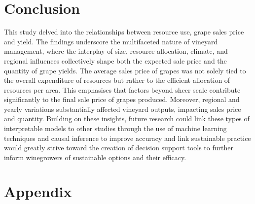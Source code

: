 \documentclass[10pt,letterpaper]{article}
\begin{document}
\section*{Conclusion}

This study delved into the relationships between resource use, grape sales price and yield. The findings underscore the multifaceted nature of vineyard management, where the interplay of size, resource allocation, climate, and regional influences collectively shape both the expected sale price and the quantity of grape yields. The average sales price of grapes was not solely tied to the overall expenditure of resources but rather to the efficient allocation of resources per area. This emphasises that factors beyond sheer scale contribute significantly to the final sale price of grapes produced. Moreover, regional and yearly variations substantially affected vineyard outputs, impacting sales price and quantity. Building on these insights, future research could link these types of interpretable models to other studies through the use of machine learning techniques and causal inference to improve accuracy and link sustainable practice would greatly strive toward the creation of decision support tools to further inform winegrowers of sustainable options and their efficacy.

\nolinenumbers

% 


 \appendix

\section*{Appendix}

\renewcommand{\thefigure}{S\arabic{figure}}
\renewcommand{\thetable}{S\arabic{table}}
\setcounter{figure}{0} %
\setcounter{table}{0}  %

\par
\end{document}
